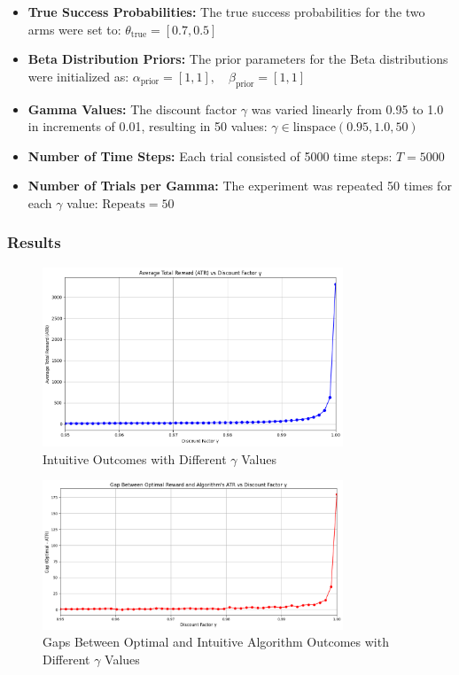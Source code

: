 \documentclass[11pt]{article}
\begin{document}
\begin{itemize}
    \item \textbf{True Success Probabilities:} The true success probabilities for the two arms were set to: $\theta_{\text{true}} = [0.7, 0.5]$
    \item \textbf{Beta Distribution Priors:} The prior parameters for the Beta distributions were initialized as:
    $\alpha_{\text{prior}} = [1, 1], \quad \beta_{\text{prior}} = [1, 1]$
    \item \textbf{Gamma Values:} The discount factor $\gamma$ was varied linearly from 0.95 to 1.0 in increments of 0.01, resulting in 50 values:
    $\gamma \in \text{linspace}(0.95, 1.0, 50)$
    \item \textbf{Number of Time Steps:} Each trial consisted of 5000 time steps:
    $T = 5000$
    \item \textbf{Number of Trials per Gamma:} The experiment was repeated 50 times for each $\gamma$ value:
    $\text{Repeats} = 50$
\end{itemize}

\subsubsection*{Results}
\begin{figure}[H]
    \centering
    \includegraphics[width=0.8\textwidth]{pics/intuitive.png}
    \caption{Intuitive Outcomes with Different $\gamma$ Values}
    \label{fig:intuitive_outcomes}
\end{figure}

\begin{figure}[H]
    \centering
    \includegraphics[width=0.8\textwidth]{pics/gaps.png}
    \caption{Gaps Between Optimal and Intuitive Algorithm Outcomes with Different $\gamma$ Values}
    \label{fig:gaps}
\end{figure}
\end{document}
